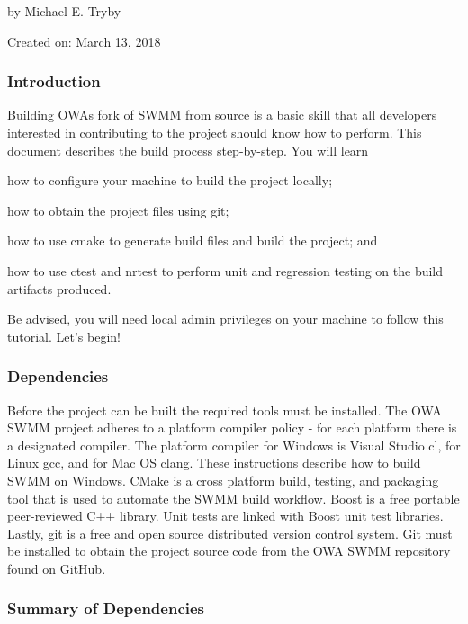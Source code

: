 by Michael E. Tryby

Created on\+: March 13, 2018

\subsubsection*{Introduction}

Building O\+WA\textquotesingle{}s fork of S\+W\+MM from source is a basic skill that all developers interested in contributing to the project should know how to perform. This document describes the build process step-\/by-\/step. You will learn


\begin{DoxyEnumerate}
\item how to configure your machine to build the project locally;
\item how to obtain the project files using git;
\item how to use cmake to generate build files and build the project; and
\item how to use ctest and nrtest to perform unit and regression testing on the build artifacts produced.
\end{DoxyEnumerate}

Be advised, you will need local admin privileges on your machine to follow this tutorial. Let’s begin!

\subsubsection*{Dependencies}

Before the project can be built the required tools must be installed. The O\+WA S\+W\+MM project adheres to a platform compiler policy -\/ for each platform there is a designated compiler. The platform compiler for Windows is Visual Studio cl, for Linux gcc, and for Mac OS clang. These instructions describe how to build S\+W\+MM on Windows. C\+Make is a cross platform build, testing, and packaging tool that is used to automate the S\+W\+MM build workflow. Boost is a free portable peer-\/reviewed C++ library. Unit tests are linked with Boost unit test libraries. Lastly, git is a free and open source distributed version control system. Git must be installed to obtain the project source code from the O\+WA S\+W\+MM repository found on Git\+Hub.

\subsubsection*{Summary of Dependencies}


